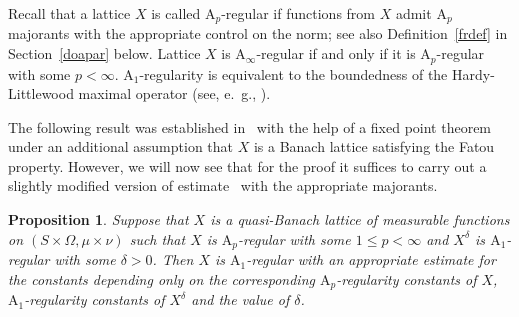 \documentclass[12pt]{amsart}
\newtheorem {proposition} [theorem] {Proposition}
\newcommand {\apclass} [1] {\ensuremath{\mathrm A_{#1}}}
\begin{document}
\label {mlr}

Recall that a lattice $X$ is called $\apclass {p}$-regular if functions from $X$ admit $\apclass {p}$ majorants
with the appropriate control on the norm; see also Definition~\ref {frdef} in Section~\ref {doapar} below.
Lattice $X$ is $\apclass {\infty}$-regular if and only if it is $\apclass {p}$-regular with some $p < \infty$.
$\apclass {1}$-regularity is equivalent to the boundedness of the Hardy-Littlewood
maximal operator (see, e.~g., \cite [Proposition~1] {rutsky2011en}).

The following result was established in~\cite [Theorem~8] {rutsky2014sm}
with the help of a fixed point theorem under an additional assumption that
$X$ is a Banach lattice satisfying the Fatou property.
However, we will now see that
for the proof
it suffices to carry out
a slightly modified version of estimate~\cite [(6)] {rutsky2014sm} with the appropriate majorants.
\begin {proposition}
\label {a1apt}
Suppose that $X$ is a quasi-Banach lattice of measurable functions on $(S \times \Omega, \mu \times \nu)$
such that $X$ is $\apclass {p}$-regular with some $1 \leqslant p < \infty$ and $X^\delta$ is $\apclass {1}$-regular with
some $\delta > 0$.  Then $X$ is $\apclass {1}$-regular with 
an appropriate estimate for the
constants depending only on the corresponding $\apclass {p}$-regularity constants of $X$,
$\apclass {1}$-regularity constants of $X^\delta$ and the value of $\delta$.
\end {proposition}
\end{document}
